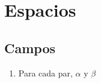 \chapter{Espacios}

\section{Campos}

\begin{enumerate}[ \bfseries (A)]
    \item Para cada par, $\alpha$ y $\beta$
\end{enumerate}
